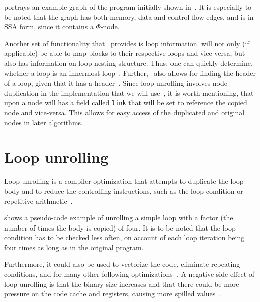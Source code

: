  portrays an example \libFIRM{} graph of the program initially shown in~.
It is especially to be noted that the graph has both memory, data and control-flow edges, and is in SSA form, since it contains a $\Phi$-node.


Another set of functionality that~\libFIRM{} provides is loop information.
\libFIRM{} will not only (if applicable) be able to map blocks to their respective loops and vice-versa, but also has information on loop nesting structure.
Thus, one can quickly determine, whether a loop is an innermost loop~\cite{libfirm}.
Further,~\libFIRM{} also allows for finding the header of a loop, given that it has a header~\cite{aebi18bachelorarbeit}.
Since loop unrolling involves node duplication in the implementation that we will use~\cite{aebi18bachelorarbeit}, it is worth mentioning, that upon a node will has a field called \texttt{link} that will be set to reference the copied node and vice-versa.
This allows for easy access of the duplicated and original nodes in later algorithms.

\section{Loop unrolling}\label{sec:basics:unrolling}

Loop unrolling is a compiler optimization that attempts to duplicate the loop body and to reduce the controlling instructions, such as the loop condition or repetitive arithmetic~\cite{aho_ullman_1979}.

 shows a pseudo-code example of unrolling a simple loop with a factor (the number of times the body is copied) of four.
It is to be noted that the loop condition has to be checked less often, on account of each loop iteration being four times as long as in the original program.

Furthermore, it could also be used to vectorize the code, eliminate repeating conditions, and for many other following optimizations~\cite{fog_2018}.
A negative side effect of loop unrolling is that the binary size increases and that there could be more pressure on the code cache and registers, causing more spilled values~\cite{Sarkar2001}.

